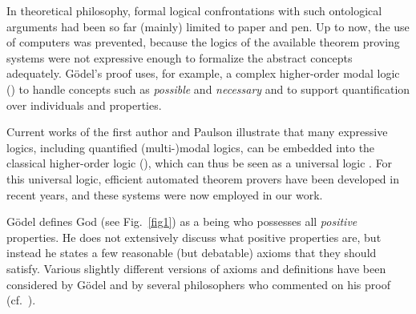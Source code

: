 \documentclass{ecai2014}
\newcommand\entity[1]{\text{\textrm{#1}}}
\def\HOML{\entity{HOML}\xspace}
\def\HOL{\entity{HOL}\xspace}
\begin{document}
In theoretical philosophy, formal logical confrontations with such
ontological arguments had been so far (mainly) limited to paper
and pen.  Up to now, the use of computers was prevented, because the
logics of the available theorem proving systems were not expressive
enough to formalize the abstract concepts adequately. G{\"o}del's proof
uses, for example, a complex higher-order modal logic (\HOML) to handle
concepts such as \emph{possible} and \emph{necessary} and to support
quantification over individuals and properties.

Current works \cite{J23,B9} of the first author and Paulson illustrate that many
expressive logics, including quantified (multi-)modal logics, can be
embedded into the classical higher-order logic (\HOL), which can thus be seen
as a universal logic \cite{C36}. For this universal logic, efficient automated
theorem provers have been developed in recent years, and these systems
were now employed in our work.

G\"{o}del defines God (see Fig.~\ref{fig1}) as a being who possesses all \emph{positive}
properties.  He does not extensively discuss what positive properties
are, but instead he states a few reasonable (but debatable) axioms
that they should satisfy.  Various slightly different versions of
axioms and definitions have been considered by G\"{o}del and by
several philosophers who commented on his proof
(cf.~\cite{sobel2004logic,anderson90:_some_emend_of_goedel_ontol_proof,AndersonGettings,Fitting,Adams,ContemporaryBibliography}).
\end{document}

